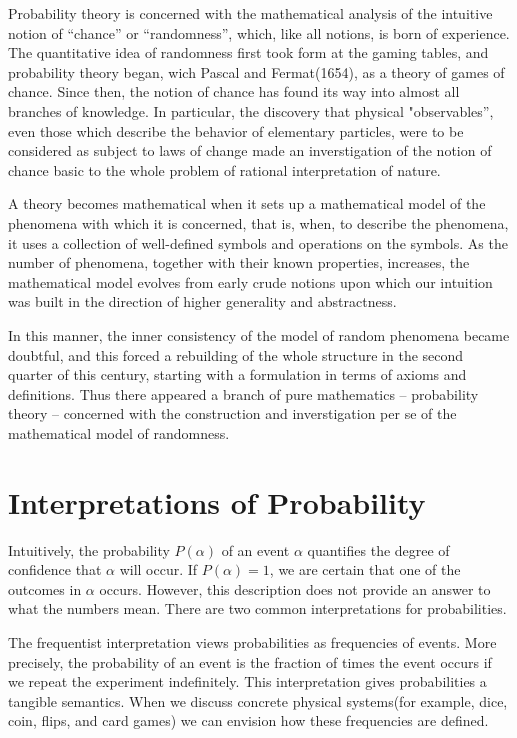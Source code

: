 \documentclass[a4paper]{book}
\begin{document}
  Probability theory is concerned with the mathematical analysis of the
  intuitive notion of ``chance'' or ``randomness'', which, like all
  notions, is born of experience. The quantitative idea of randomness
  first took form at the gaming tables, and probability theory began,
  wich Pascal and Fermat(1654), as a theory of games of chance. Since
  then, the notion of chance has found its way into almost all branches
  of knowledge. In particular, the discovery that physical
  "observables'', even those which describe the behavior of elementary
  particles, were to be considered as subject to laws of change made an
  inverstigation of the notion of chance basic to the whole problem of
  rational interpretation of nature.\cite{1977probability}

  A theory becomes mathematical when it sets up a mathematical model of
  the phenomena with which it is concerned, that is, when, to describe
  the phenomena, it uses a collection of well-defined symbols and
  operations on the symbols. As the number of phenomena, together with
  their known properties, increases, the mathematical model evolves from
  early crude notions upon which our intuition was built in the
  direction of higher generality and abstractness.\cite{1977probability}

  In this manner, the inner consistency of the model of random phenomena
  became doubtful, and this forced a rebuilding of the whole structure
  in the second quarter of this century, starting with a formulation in
  terms of axioms and definitions. Thus there appeared a branch of pure
  mathematics -- probability theory -- concerned with the construction
  and inverstigation per se of the mathematical model of
  randomness.\cite{1977probability}

\section{Interpretations of Probability}

  Intuitively, the probability $P(\alpha)$ of an event $\alpha$
  quantifies the degree of confidence that $\alpha$ will occur. If
  $P(\alpha) = 1$, we are certain that one of the outcomes in $\alpha$
  occurs. However, this description does not provide an answer to what
  the numbers mean. There are two common interpretations for
  probabilities.\cite{koller2009probabilistic}

  The frequentist interpretation views probabilities as frequencies of
  events. More precisely, the probability of an event is the fraction of
  times the event occurs if we repeat the experiment indefinitely. This
  interpretation gives probabilities a tangible semantics. When we
  discuss concrete physical systems(for example, dice, coin, flips, and
  card games) we can envision how these frequencies are
  defined.\cite{koller2009probabilistic}
\end{document}
